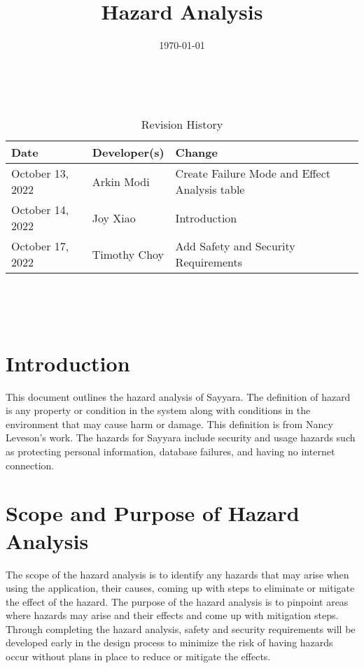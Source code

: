 \documentclass{article}
\title{Hazard Analysis\\\progname}
\author{\authname}
\date{\today}
\begin{document}
\maketitle
\thispagestyle{empty}

~\newpage


\begin{table}[hp]
	\caption{Revision History} \label{TblRevisionHistory}
	\begin{tabularx}{\textwidth}{llX}
		\toprule
		\textbf{Date}    & \textbf{Developer(s)} & \textbf{Change}                               \\
		\midrule
		October 13, 2022 & Arkin Modi            & Create Failure Mode and Effect Analysis table \\
		October 14, 2022 & Joy Xiao              & Introduction                                  \\
		October 17, 2022 & Timothy Choy          & Add Safety and Security Requirements          \\
		\bottomrule
	\end{tabularx}
\end{table}

~\newpage

\tableofcontents

~\newpage



\section{Introduction}
This document outlines the hazard analysis of Sayyara. The definition of hazard is any property or
condition in the system along with conditions in the environment that may cause harm or damage.
This definition is from Nancy Leveson's work. The hazards for Sayyara include security and usage
hazards such as protecting personal information, database failures, and having no internet
connection.

\section{Scope and Purpose of Hazard Analysis}
The scope of the hazard analysis is to identify any hazards that may arise when using the
application, their causes, coming up with steps to eliminate or mitigate the effect of the hazard.
The purpose of the hazard analysis is to pinpoint areas where hazards may arise and their effects
and come up with mitigation steps. Through completing the hazard analysis, safety and security
requirements will be developed early in the design process to minimize the risk of having hazards
occur without plans in place to reduce or mitigate the effects.
\end{document}

